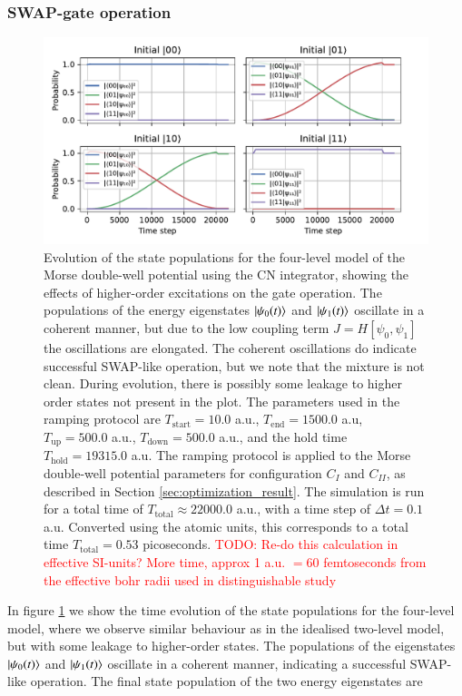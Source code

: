 \documentclass{subfiles}
\begin{document}
\subsubsection*{SWAP-gate operation}
\begin{figure}[h!]
    \centering
    \includegraphics[width=1.0\textwidth]{figs/time_evolution_4_basefunctions_2206_2nd.pdf}
    \caption{Evolution of the state populations for the four-level model of the Morse double-well potential using the CN integrator, showing the effects of higher-order excitations on the gate operation. The populations of the energy eigenstates $\ket{\psi_0(t)}$ and $\ket{\psi_1(t)}$ oscillate in a coherent manner, but due to the low coupling term $J=H[\psi_0, \psi_1]$ the oscillations are elongated. The coherent oscillations do indicate successful SWAP-like operation, but we note that the mixture is not clean. During evolution, there is possibly some leakage to higher order states not present in the plot.
    The parameters used in the ramping protocol are $T_{\text{start}} = 10.0$ a.u., $T_{\text{end}} = 1500.0$ a.u, $T_{\text{up}} = 500.0$ a.u., $T_{\text{down}} = 500.0$ a.u., and the hold time $T_{\text{hold}} = 19 315.0$ a.u. The ramping protocol is applied to the Morse double-well potential parameters for configuration $C_I$ and $C_{II}$, as described in Section \ref{sec:optimization_result}. The simulation is run for a total time of $T_{\text{total}} \approx 22 000.0$ a.u., with a time step of $\Delta t = 0.1$ a.u. Converted using the atomic units, this corresponds to a total time $T_{\text{total}}=0.53$ picoseconds. \textcolor{red}{TODO: Re-do this calculation in effective SI-units? More time, approx 1 a.u. $=60$ femtoseconds from the effective bohr radii used in distinguishable study}
    }
    \label{fig:time_evolution_4_basefunctions}
\end{figure}
In figure \ref{fig:time_evolution_4_basefunctions} we show the time evolution of the state populations for the four-level model, where we observe similar behaviour as in the idealised two-level model, but with some leakage to higher-order states. The populations of the eigenstates $\ket{\psi_0(t)}$ and $\ket{\psi_1(t)}$ oscillate in a coherent manner, indicating a successful SWAP-like operation. The final state population of the two energy eigenstates are
\end{document}
